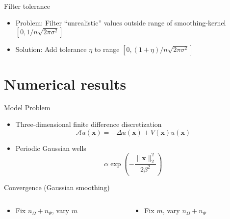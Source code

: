 \documentclass[aspectratio=169, leqno, 12pt]{beamer}
\newcommand{\vct}[1]{\boldsymbol{#1}}
\begin{document}
\begin{frame}{Filter tolerance}
    \begin{itemize}
        \item Problem: Filter \enquote{unrealistic} values outside range of \gls{smoothing-kernel} $[0, 1/n\sqrt{2\pi\sigma^2}]$
        \item Solution: Add tolerance $\eta$ to range $[0, (1 + \eta)/n\sqrt{2\pi\sigma^2}]$
    \end{itemize}
    \centering
    \scalebox{0.8}{}
\end{frame}

\section{Numerical results}

\begin{frame}{Model Problem}
    \begin{itemize}
        \item Three-dimensional finite difference discretization \cite{lin2017randomized}
        \begin{equation}
            \mathcal{A} u(\vct{x}) = - \Delta u(\vct{x}) + V(\vct{x}) u(\vct{x})
        \end{equation}
        \item Periodic Gaussian wells
        \begin{equation}
            \alpha \exp(-\frac{\lVert \vct{x} \rVert _2^2}{ 2 \beta^2 })
        \end{equation}
    \end{itemize}
    \scalebox{0.85}{}
    \scalebox{0.85}{}
    \scalebox{0.85}{}
\end{frame}

\begin{frame}{Convergence (Gaussian smoothing)}
    \begin{columns}
        \begin{column}{0.5\textwidth}
            \begin{itemize}
                \item Fix $n_{\Omega} + n_{\Psi}$, vary $m$
            \end{itemize}
            \scalebox{1.0}{}
        \end{column}
        \begin{column}{0.5\textwidth}
            \begin{itemize}
                \item Fix $m$, vary $n_{\Omega} + n_{\Psi}$
            \end{itemize}
            \scalebox{1.0}{}
        \end{column}
    \end{columns}
\end{frame}
\end{document}

